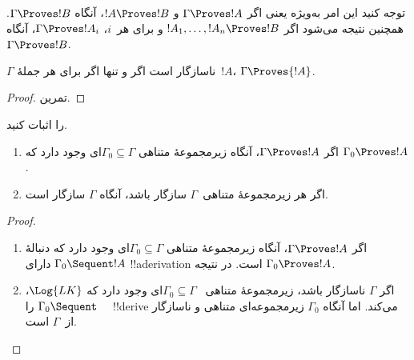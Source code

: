 \documentclass[../../../include/open-logic-section]{subfiles}
\begin{document}
توجه کنید این امر به‌ویژه یعنی اگر $\Gamma \Proves !A$ و
$!A \Proves !B$، آنگاه $\Gamma \Proves !B$. همچنین نتیجه می‌شود اگر
$!A_1,\dots,!A_n \Proves !B$ و برای هر~$i$،
$\Gamma \Proves !A_i$، آنگاه $\Gamma \Proves !B$.

\begin{prop}
$\Gamma$ ناسازگار است اگر و تنها اگر برای هر جملهٔ~$!A$،
$\Gamma \Proves {!A}$.
\end{prop}

\begin{proof}
تمرین.
\end{proof}

\begin{prob}
 را اثبات کنید.
\end{prob}

\begin{prop}[فشردگی]
  \begin{enumerate}
  \item اگر $\Gamma \Proves !A$، آنگاه زیرمجموعهٔ متناهی
    $\Gamma_0 \subseteq \Gamma$ای وجود دارد که
    $\Gamma_0 \Proves !A$.
  \item اگر هر زیرمجموعهٔ متناهی~$\Gamma$ سازگار باشد، آنگاه
    $\Gamma$ سازگار است.
  \end{enumerate}
\end{prop}

\begin{proof}
  \begin{enumerate}
    \item اگر $\Gamma \Proves !A$، آنگاه زیرمجموعهٔ متناهی
      $\Gamma_0 \subseteq \Gamma$ای وجود دارد که دنبالهٔ
      $\Gamma_0 \Sequent !A$ دارای !!a{derivation} است. در نتیجه
      $\Gamma_0 \Proves !A$.
    \item اگر $\Gamma$ ناسازگار باشد، زیرمجموعهٔ متناهی
      ~$\Gamma_0 \subseteq \Gamma$ای وجود دارد که $\Log{LK}$،
      $\Gamma_0 \Sequent \quad$ را !!{derive} می‌کند. اما آنگاه
      $\Gamma_0$ زیرمجموعه‌ای متناهی و ناسازگار از~$\Gamma$ است.
  \end{enumerate}
\end{proof}
\end{document}
